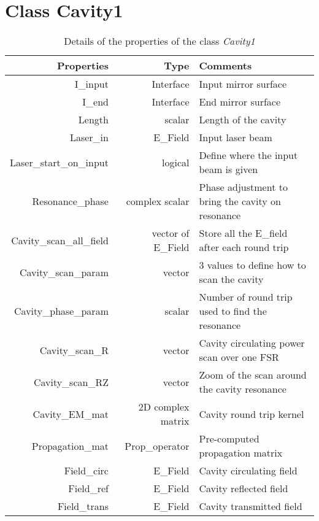 \section{Class Cavity1}

\begin{table}
  \centering
  \caption{\label{App3:Cavity} Details of the properties of the class \textsl{Cavity1} }
\begin{tabular}{|r r l|}
\hline
{\Large\strut} Properties & Type &  Comments \\
\hline
{\Large\strut} I\_input &  Interface & Input mirror surface \\
{\Large\strut} I\_end &  Interface & End mirror surface \\
{\Large\strut} Length &  scalar & Length of the cavity \\
{\Large\strut} Laser\_in &  E\_Field & Input laser beam \\
{\Large\strut} Laser\_start\_on\_input &  logical  & Define where the input beam is given \\
{\Large\strut} Resonance\_phase &  complex scalar &  Phase adjustment to bring the cavity on resonance \\
{\Large\strut} Cavity\_scan\_all\_field & vector of E\_Field  &  Store all the E\_field after each round trip \\
{\Large\strut} Cavity\_scan\_param &  vector &  3 values to define how to scan the cavity \\
{\Large\strut} Cavity\_phase\_param &  scalar & Number of round trip used to find the resonance \\
{\Large\strut} Cavity\_scan\_R &  vector  & Cavity circulating power scan over one FSR \\
{\Large\strut} Cavity\_scan\_RZ &  vector &  Zoom of the scan around the cavity resonance \\
{\Large\strut} Cavity\_EM\_mat &  2D complex matrix &  Cavity round trip kernel \\
{\Large\strut} Propagation\_mat & Prop\_operator & Pre-computed propagation matrix \\
{\Large\strut} Field\_circ &  E\_Field &  Cavity circulating field \\
{\Large\strut} Field\_ref &  E\_Field & Cavity reflected field  \\
{\Large\strut} Field\_trans &  E\_Field & Cavity transmitted field  \\
\hline
\end{tabular}
\end{table}

